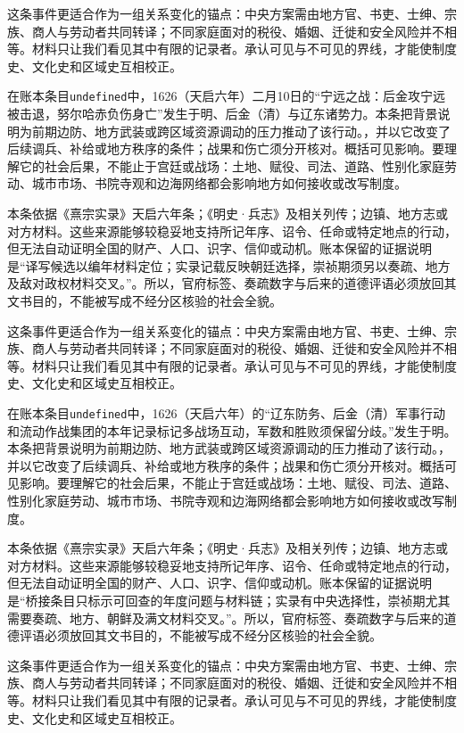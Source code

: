 这条事件更适合作为一组关系变化的锚点：中央方案需由地方官、书吏、士绅、宗族、商人与劳动者共同转译；不同家庭面对的税役、婚姻、迁徙和安全风险并不相等。材料只让我们看见其中有限的记录者。承认可见与不可见的界线，才能使制度史、文化史和区域史互相校正。

在账本条目\texttt{undefined}中，1626（天启六年）二月10日的“宁远之战：后金攻宁远被击退，努尔哈赤负伤身亡”发生于明、后金（清）与辽东诸势力。本条把背景说明为前期边防、地方武装或跨区域资源调动的压力推动了该行动。，并以它改变了后续调兵、补给或地方秩序的条件；战果和伤亡须分开核对。概括可见影响。要理解它的社会后果，不能止于宫廷或战场：土地、赋役、司法、道路、性别化家庭劳动、城市市场、书院寺观和边海网络都会影响地方如何接收或改写制度。

本条依据《熹宗实录》天启六年条；《明史·兵志》及相关列传；边镇、地方志或对方材料。这些来源能够较稳妥地支持所记年序、诏令、任命或特定地点的行动，但无法自动证明全国的财产、人口、识字、信仰或动机。账本保留的证据说明是“译写候选以编年材料定位；实录记载反映朝廷选择，崇祯期须另以奏疏、地方及敌对政权材料交叉。”。所以，官府标签、奏疏数字与后来的道德评语必须放回其文书目的，不能被写成不经分区核验的社会全貌。

这条事件更适合作为一组关系变化的锚点：中央方案需由地方官、书吏、士绅、宗族、商人与劳动者共同转译；不同家庭面对的税役、婚姻、迁徙和安全风险并不相等。材料只让我们看见其中有限的记录者。承认可见与不可见的界线，才能使制度史、文化史和区域史互相校正。

在账本条目\texttt{undefined}中，1626（天启六年）的“辽东防务、后金（清）军事行动和流动作战集团的本年记录标记多战场互动，军数和胜败须保留分歧。”发生于明。本条把背景说明为前期边防、地方武装或跨区域资源调动的压力推动了该行动。，并以它改变了后续调兵、补给或地方秩序的条件；战果和伤亡须分开核对。概括可见影响。要理解它的社会后果，不能止于宫廷或战场：土地、赋役、司法、道路、性别化家庭劳动、城市市场、书院寺观和边海网络都会影响地方如何接收或改写制度。

本条依据《熹宗实录》天启六年条；《明史·兵志》及相关列传；边镇、地方志或对方材料。这些来源能够较稳妥地支持所记年序、诏令、任命或特定地点的行动，但无法自动证明全国的财产、人口、识字、信仰或动机。账本保留的证据说明是“桥接条目只标示可回查的年度问题与材料链；实录有中央选择性，崇祯期尤其需要奏疏、地方、朝鲜及满文材料交叉。”。所以，官府标签、奏疏数字与后来的道德评语必须放回其文书目的，不能被写成不经分区核验的社会全貌。

这条事件更适合作为一组关系变化的锚点：中央方案需由地方官、书吏、士绅、宗族、商人与劳动者共同转译；不同家庭面对的税役、婚姻、迁徙和安全风险并不相等。材料只让我们看见其中有限的记录者。承认可见与不可见的界线，才能使制度史、文化史和区域史互相校正。

